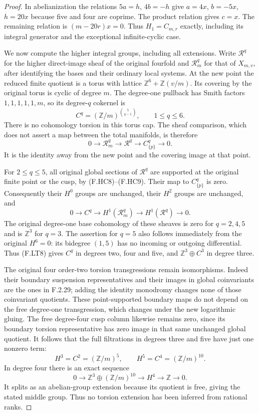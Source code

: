 \begin{proof}
In abelianization the relations $5a=h$, $4b=-h$
give $a=4x$, $b=-5x$, $h=20x$ because five and four
are coprime.
The product relation gives $c=x$.
The remaining relation is $(m-20r)x=0$.
Thus $H_1=C_{m,r}$ exactly, including its integral
generator and the exceptional infinite-cyclic case.

We now compute the higher integral groups, including
all extensions.
Write $\mathcal R^q$ for the higher direct-image
sheaf of the original fourfold and
$\mathcal R_m^q$ for that of $X_{m,v}$, after identifying
the bases and their ordinary local systems.
At the new point the reduced finite quotient is a
torus with lattice
$\mathbb Z^6+\mathbb Z(v/m)$.
Its covering by the original torus is cyclic of
degree $m$.
The degree-one pullback has Smith factors
$1,1,1,1,1,m$, so its degree-$q$ cokernel is
\[
 C^q=(\mathbb Z/m)^{\binom5{q-1}},
 \qquad 1\le q\le6 .
\tag{F.LT6}
\]
There is no cohomology torsion in this torus cap.
The sheaf comparison, which does not assert a map
between the total manifolds, is therefore
\[
 0\longrightarrow\mathcal R_m^q
  \longrightarrow\mathcal R^q
  \longrightarrow C^q_{\{p\}}\longrightarrow0 .
\tag{F.LT7}
\]
It is the identity away from the new point and the
covering image at that point.

For $2\le q\le5$, all original global sections of
$\mathcal R^q$ are supported at the original finite
point or the cusp, by (F.HC8)--(F.HC9).
Their map to $C^q_{\{p\}}$ is zero.
Consequently their $H^0$ groups are unchanged,
their $H^2$ groups are unchanged, and
\[
 0\longrightarrow C^q
  \longrightarrow H^1(\mathcal R_m^q)
  \longrightarrow H^1(\mathcal R^q)
  \longrightarrow0 .
\tag{F.LT8}
\]
The original degree-one base cohomology of these
sheaves is zero for $q=2,4,5$ and is $\mathbb Z^3$
for $q=3$.
The assertion for $q=5$ also follows immediately
from the original $H^6=0$: its bidegree $(1,5)$
has no incoming or outgoing differential.
Thus (F.LT8) gives $C^q$ in degrees two, four and
five, and $\mathbb Z^3\oplus C^3$ in degree three.

The original four order-two torsion transgressions
remain isomorphisms.
Indeed their boundary suspension representatives and
their images in global coinvariants are the ones in
F.2.29; adding the identity monodromy changes none
of those coinvariant quotients.
These point-supported boundary maps do not depend
on the free degree-one transgression, which changes
under the new logarithmic gluing.
The free degree-four cusp column likewise remains
zero, since its boundary torsion representative has
zero image in that same unchanged global quotient.
It follows that the full filtrations in degrees
three and five have just one nonzero term:
\[
 H^3=C^2=(\mathbb Z/m)^5,\qquad
 H^5=C^4=(\mathbb Z/m)^{10}.
\tag{F.LT9}
\]
In degree four there is an exact sequence
\[
 0\longrightarrow
       \mathbb Z^3\oplus(\mathbb Z/m)^{10}
  \longrightarrow H^4
  \longrightarrow\mathbb Z\longrightarrow0.
\]
It splits as an abelian-group extension because
its quotient is free, giving the stated middle group.
Thus no torsion extension has been inferred from
rational ranks.


\end{proof}
